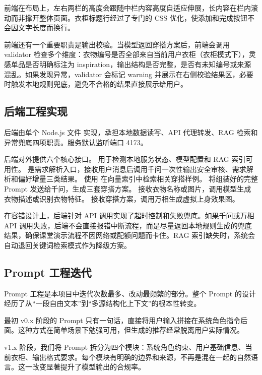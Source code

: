 \documentclass{applemlr}
\begin{document}
前端在布局上，左右两栏的高度会跟随中栏内容高度自适应伸展，长内容在栏内滚动而非撑开整体页面。衣柜标题行经过了专门的 CSS 优化，使添加和完成按钮不会因文字长度而换行。

前端还有一个重要职责是输出校验。当模型返回穿搭方案后，前端会调用 validator 检查多个维度：衣物编号是否全部来自当前用户衣柜（衣柜模式下），灵感单品是否明确标注为 inspiration，输出结构是否完整，是否有未知编号或来源混乱。如果发现异常，validator 会标记 warning 并展示在右侧校验结果区，必要时触发本地规则兜底，避免不合格的结果直接展示给用户。

\subsection{后端工程实现}

后端由单个 Node.js 文件  实现，承担本地数据读写、API 代理转发、RAG 检索和异常兜底四项职责。服务默认监听端口 4173。

后端对外提供六个核心接口。 用于检测本地服务状态、模型配置和 RAG 索引可用性。 是需求解析入口，接收用户消息后调用千问一次性输出安全审核、需求解析和偏好增量三类结果。 使用  在向量索引中检索相关穿搭样例。 将组装好的完整 Prompt 发送给千问，生成三套穿搭方案。 接收衣物名称或图片，调用模型生成衣物描述或识别衣物特征。 接收穿搭方案，调用万相生成虚拟上身效果图。

在容错设计上，后端针对 API 调用实现了超时控制和失败兜底。如果千问或万相 API 调用失败，后端不会直接报错中断流程，而是尽量返回本地规则生成的兜底结果，确保课堂演示流程不因网络或配额问题而卡住。RAG 索引缺失时，系统会自动退回关键词检索模式作为降级方案。

\subsection{Prompt 工程迭代}

Prompt 工程是本项目中迭代次数最多、改动最频繁的部分。整个 Prompt 的设计经历了从``一段自由文本''到``多源结构化上下文''的根本性转变。

最初 v0.x 阶段的 Prompt 只有一句话，直接将用户输入拼接在系统角色指令后面。这种方式在简单场景下勉强可用，但生成的推荐经常脱离用户实际情况。

v1.x 阶段，我们将 Prompt 拆分为四个模块：系统角色约束、用户基础信息、当前衣柜、输出格式要求。每个模块有明确的边界和来源，不再是混在一起的自然语言。这一改变显著提升了模型输出的合规率。
\end{document}
